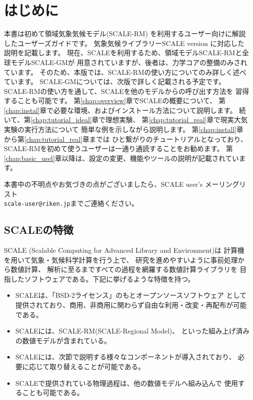 \section{はじめに} \label{sec:introduction}

本書は初めて領域気象気候モデル(SCALE-RM)
を利用するユーザー向けに解説したユーザーズガイドです。
気象気候ライブラリーSCALE version \version に対応した説明を記載します。
現在、SCALEを利用するため、領域モデルSCALE-RMと全球モデルSCALE-GMが
用意されていますが、後者は、力学コアの整備のみされています。
そのため、本版では、SCALE-RMの使い方についてのみ詳しく述べています。
SCALE-GMについては、次版で詳しく記載される予定です。
SCALE-RMの使い方を通して、SCALEを他のモデルからの呼び出す方法を
習得することも可能です。
第\ref{chap:overview}章でSCALEの概要について、
第\ref{chap:instal}章で必要な環境、およびインストール方法について説明します。
続いて、第\ref{chap:tutorial_ideal}章で理想実験、
第\ref{chap:tutorial_real}章で現実大気実験の実行方法について
簡単な例を示しながら説明します。
第\ref{chap:install}章から第\ref{chap:tutorial_real}章までは
ひと繋がりのチュートリアルとなっており、
SCALE-RMを初めて使うユーザーは一通り通読することをお勧めます。
第\ref{chap:basic_usel}章以降は、設定の変更、機能やツールの説明が記載されています。

本書中の不明点やお気づきの点がございましたら、SCALE user's メーリングリスト\\
 \verb|scale-user@riken.jp|までご連絡ください。



\subsection{SCALEの特徴} \label{subsec:scale_feature}

SCALE (Scalable Computing for Advanced Library and Environment)は
計算機を用いて気象・気候科学計算を行う上で、
研究を進めやすいように事前処理から数値計算、
解析に至るまですべての過程を網羅する数値計算ライブラリを
目指したソフトウェアである。下記に挙げるような特徴を持つ。
\begin{itemize}
\item SCALEは、「BSD-2ライセンス」のもとオープンソースソフトウェア
として提供されており、商用、非商用に関わらず自由な利用・改変・再配布が可能である。
\item SCALEには、SCALE-RM(SCALE-Regional Model)、
といった組み上げ済みの数値モデルが含まれている。
\item SCALEには、次節で説明する様々なコンポーネントが導入されており、
必要に応じて取り替えることが可能である。
\item SCALEで提供されている物理過程は、他の数値モデルへ組み込んで
使用することも可能である。
\end{itemize}

